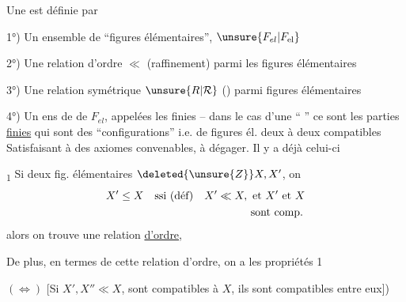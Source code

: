 Une \uline{} est définie par

1°) Un ensemble de ``figures élémentaires'', $\unsure{F_{el}|F_{\mathrm{el}}}$

2°) Une relation d'ordre $\ll$  (raffinement) parmi les figures élémentaires

3°) Une relation  symétrique $\unsure{R|\mathcal{R}}$ () parmi figures élémentaires


4°) Un ens de  de $F_{el}$, appelées les \unsure{---} finies -- dans le cas d'une `` '' ce sont les parties \uline{finies} qui sont des ``configurations''  i.e.  de figures él. deux à deux compatibles
Satisfaisant à des axiomes convenables, à dégager. Il y a déjà celui-ci

\uline{}\textsubscript{1}  Si  deux fig. élémentaires $\deleted{\unsure{Z}}X, X'$, on 
\[
\begin{aligned}
X'\leq X\quad &\text{ssi (déf)}\quad X'\ll X,\ \text{et }X'\text{ et }X\\
&\hphantom{\text{ssi (déf)}\quad X'\ll X,\ }\text{sont comp.}
\end{aligned}
\]
alors on trouve une relation \uline{d'ordre},

De plus, en termes de cette relation d'ordre, on a les propriétés \uline{} 1

\margin{$\vert\vert\vert$}
$(\Longleftrightarrow)$ [Si $X', X''\ll X$,  sont compatibles à $X$, ils sont compatibles entre eux])

